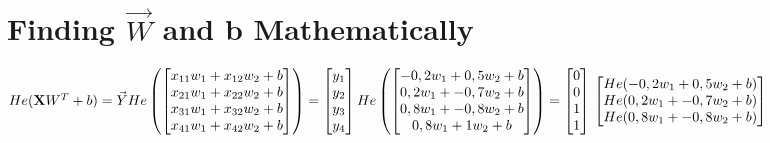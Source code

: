 \documentclass{article}
\begin{document}
    \section{Finding $\vec{W}$ and b Mathematically}
        \begin{math}
            He(\mathbf{X}W^{T}+b)=\vec{Y}\\
            \\
            He\left(
            \begin{bmatrix}
                x_{11}w_{1} + x_{12}w_{2} + b \\
                x_{21}w_{1} + x_{22}w_{2} + b \\
                x_{31}w_{1} + x_{32}w_{2} + b \\
                x_{41}w_{1} + x_{42}w_{2} + b
            \end{bmatrix}
            \right) = 
                \begin{bmatrix}
                y_1 \\
                y_2 \\
                y_3 \\
                y_4
            \end{bmatrix}
            \\
            \\
          He\left(
            \begin{bmatrix}
                -0,2w_{1} + 0,5w_{2} + b \\
                0,2w_{1} + -0,7w_{2} + b \\
                0,8w_{1} + -0,8w_{2} + b \\
                0,8w_{1} + 1w_{2} + b
            \end{bmatrix}
            \right) = 
                \begin{bmatrix}
                0 \\
                0 \\
                1 \\
                1
            \end{bmatrix}
            \\
            \\
            \\
            \begin{bmatrix}
                He(-0,2w_{1} + 0,5w_{2} + b) \\
                He(0,2w_{1} + -0,7w_{2} + b) \\
                He(0,8w_{1} + -0,8w_{2} + b) \\

\end{bmatrix}
\end{math}
\end{document}
